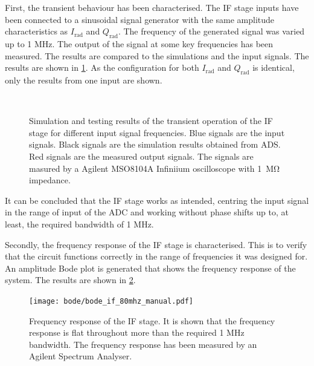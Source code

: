 First, the transient behaviour has been characterised. The IF stage inputs have been connected to a sinusoidal signal generator with the same amplitude characteristics as $I_\mathrm{rad}$ and $Q_\mathrm{rad}$. The frequency of the generated signal was varied up to 1 MHz. The output of the signal at some key frequencies has been measured. The results are compared to the simulations and the input signals. The results are shown in \cref{fig:if_signal_test}. As the configuration for both $I_\mathrm{rad}$ and $Q_\mathrm{rad}$ is identical, only the results from one input are shown.

\begin{figure}[htb]
	\centering
	 \\
	\caption{Simulation and testing results of the transient operation of the IF stage for different input signal frequencies. Blue signals are the input signals. Black signals are the simulation results obtained from ADS. Red signals are the measured output signals. The signals are masured by a Agilent MSO8104A Infiniium oscilloscope with \SI{1}{\mega\ohm} impedance. \label{fig:if_signal_test}}
\end{figure}

It can be concluded that the IF stage works as intended, centring the input signal in the range of input of the ADC and working without phase shifts up to, at least, the required bandwidth of 1 MHz.

Secondly, the frequency response of the IF stage is characterised. This is to verify that the circuit functions correctly in the range of frequencies it was designed for. An amplitude Bode plot is generated that shows the frequency response of the system. The results are shown in \cref{fig:if_bode}.

\begin{figure}[htb]
	\centering
	\texttt{[image: bode/bode\_if\_80mhz\_manual.pdf]}
	\caption{Frequency response of the IF stage. It is shown that the frequency response is flat throughout more than the required 1 MHz bandwidth. The frequency response has been measured by an Agilent Spectrum Analyser.}
	\label{fig:if_bode}
\end{figure}

